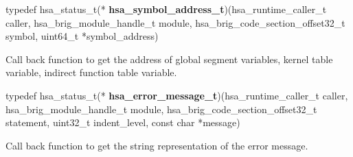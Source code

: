 \documentclass[final]{book}
\begin{document}
\begin{appendices}
\noindent\begin{tcolorbox}[nobeforeafter,arc=0mm,colframe=white,colback=lightgray,left=0mm]
typedef hsa_status_t(*  \hypertarget{group--FinalizerCoreApi-1ga47a961031477ca43f4fee297ae0d6dc1}{\textbf{hsa_symbol_address_t}})(hsa_runtime_caller_t caller, hsa_brig_module_handle_t module, hsa_brig_code_section_offset32_t symbol, uint64_t *symbol_address)
\end{tcolorbox}
Call back function to get the address of global segment variables, kernel table variable, indirect function table variable.
\\

\noindent\begin{tcolorbox}[nobeforeafter,arc=0mm,colframe=white,colback=lightgray,left=0mm]
typedef hsa_status_t(*  \hypertarget{group--FinalizerCoreApi-1ga0105dcb4254850e0ec03d44fc54e11b8}{\textbf{hsa_error_message_t}})(hsa_runtime_caller_t caller, hsa_brig_module_handle_t module, hsa_brig_code_section_offset32_t statement, uint32_t indent_level, const char *message)
\end{tcolorbox}
Call back function to get the string representation of the error message.
\\


\end{appendices}
\end{document}

